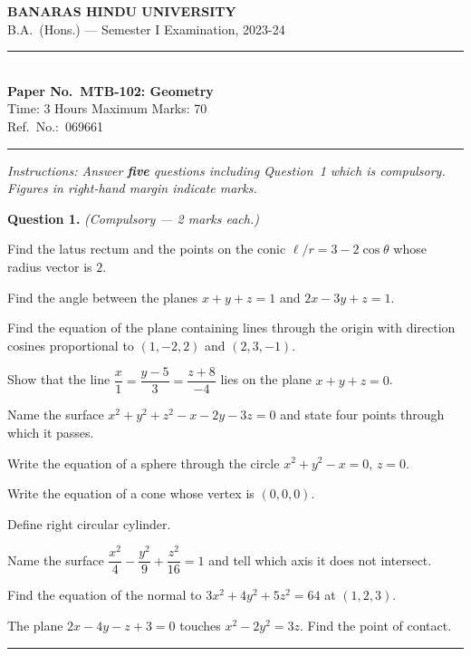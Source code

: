 \documentclass[11pt,a4paper]{article}
\begin{document}
\begin{center}
  {\large\bfseries BANARAS HINDU UNIVERSITY}\\[2pt]
  {\normalsize B.A.\ (Hons.) --- Semester I Examination, 2023-24}\\[6pt]
  \rule{0.8\linewidth}{0.5pt}\\[6pt]
  {\large\bfseries Paper No.\ MTB-102: Geometry}\\[4pt]
  {\normalsize Time: 3 Hours \hfill Maximum Marks: 70}\\[2pt]
  {\small Ref.\ No.:\ 069661}
\end{center}
\rule{\linewidth}{0.4pt}
\smallskip



\noindent   \textit{Instructions: Answer   \textbf{five} questions including Question~1 which is compulsory. Figures in right-hand margin indicate marks.}
\bigskip




\noindent   \textbf{Question 1.}   \textit{(Compulsory --- 2 marks each.)}

\begin{parts}
  \item Find the latus rectum and the points on the conic $\ell/r = 3-2\cos \theta$ whose radius vector is $2$.
  \item Find the angle between the planes $x+y+z=1$ and $2x-3y+z=1$.
  \item Find the equation of the plane containing lines through the origin with direction cosines proportional to $(1,-2,2)$ and $(2,3,-1)$.
  \item Show that the line $\dfrac{x}{1}=\dfrac{y-5}{3}=\dfrac{z+8}{-4}$ lies on the plane $x+y+z=0$.
  \item Name the surface $x^2+y^2+z^2-x-2y-3z=0$ and state four points through which it passes.
  \item Write the equation of a sphere through the circle $x^2+y^2-x=0$, $z=0$.
  \item Write the equation of a cone whose vertex is $(0,0,0)$.
  \item Define right circular cylinder.
  \item Name the surface $\dfrac{x^2}{4}-\dfrac{y^2}{9}+\dfrac{z^2}{16}=1$ and tell which axis it does not intersect.
  \item Find the equation of the normal to $3x^2+4y^2+5z^2=64$ at $(1,2,3)$.
  \item The plane $2x-4y-z+3=0$ touches $x^2-2y^2=3z$. Find the point of contact.
\end{parts}
\medskip\rule{\linewidth}{0.2pt}
\end{document}
